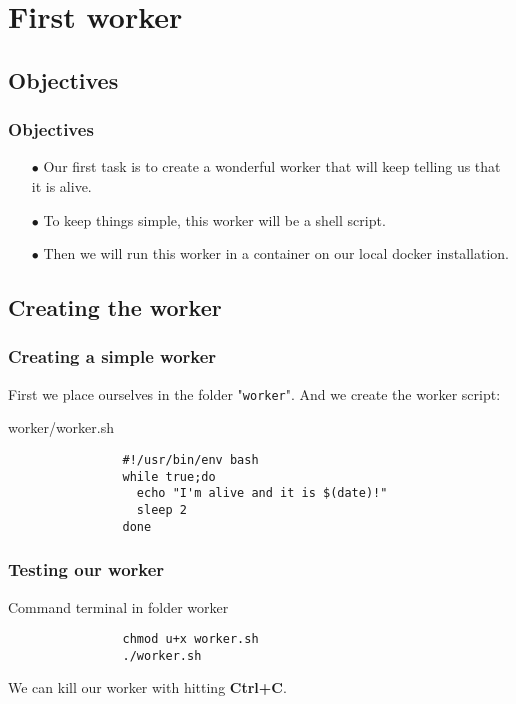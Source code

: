 \section{First worker}

\subsection{Objectives}	
	\begin{frame}
		\frametitle{Objectives}
		
		\begin{itemize}
			\item[$\bullet$] Our first task is to create a wonderful worker that will keep telling us that it is alive.
			\item[$\bullet$] To keep things simple, this worker will be a shell script.	
			\item[$\bullet$] Then we will run this worker in a container on our local docker installation.
		\end{itemize}
		
	\end{frame}

\subsection{Creating the worker}
	
	\begin{frame}[fragile]
		\frametitle{Creating a simple worker}

		First we place ourselves in the folder "\verb!worker!". And we create the worker script:
		
		\begin{block}{worker/worker.sh}
			\begin{verbatim}
				#!/usr/bin/env bash
				while true;do
				  echo "I'm alive and it is $(date)!"
				  sleep 2
				done
			\end{verbatim}
		\end{block}
		
	\end{frame}

	\begin{frame}[fragile]
		\frametitle{Testing our worker}
		
		\begin{block}{Command terminal in folder worker}
			\begin{verbatim}
				chmod u+x worker.sh
				./worker.sh
			\end{verbatim}
		\end{block}
		We can kill our worker with hitting \textbf{Ctrl+C}.
		
	\end{frame}
	
